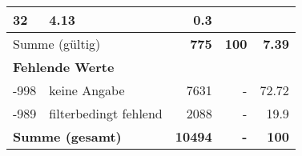 \begin{longtable}{lXrrr}
       \num{32} &
       \num[round-mode=places,round-precision=2]{4,13} &
         \num[round-mode=places,round-precision=2]{0,3} \\
     \midrule
     \multicolumn{2}{l}{Summe (gültig)} &
       \textbf{\num{775}} &
     \textbf{100} &
       \textbf{\num[round-mode=places,round-precision=2]{7,39}} \\
     \multicolumn{5}{l}{\textbf{Fehlende Werte}}\\
       -998 &
       keine Angabe &
         \num{7631} &
        - &
         \num[round-mode=places,round-precision=2]{72,72} \\
       -989 &
       filterbedingt fehlend &
         \num{2088} &
        - &
         \num[round-mode=places,round-precision=2]{19,9} \\
     \midrule
     \multicolumn{2}{l}{\textbf{Summe (gesamt)}} &
          \textbf{\num{10494}} &
        \textbf{-} &
        \textbf{100} \\
     \bottomrule
     \end{longtable}
     

